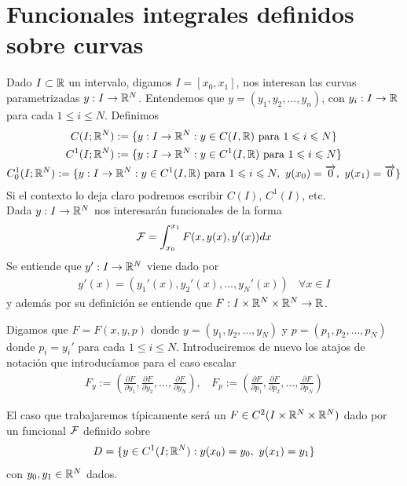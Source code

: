 \section{Funcionales integrales definidos sobre curvas}
Dado $I\subset \mathbb{R}$ un intervalo, digamos $I=[x_0, x_1]$, nos interesan las curvas parametrizadas $y:I \to \mathbb{R}^N$. Entendemos que $y=(y_1,y_2,...,y_n)$, con $y_i:I\to \mathbb{R}$ para cada $1\leq i \leq N$. Definimos 
\begin{gather*}
    C(I;\mathbb{R}^N):= \{y:I\to \mathbb{R}^N : y\in C(I,\mathbb{R})\text{ para } 1\leqslant i \leqslant N\}\\
    C^1(I;\mathbb{R}^N):= \{y:I\to \mathbb{R}^N : y\in C^1(I,\mathbb{R})\text{ para } 1\leqslant i \leqslant N\}\\
    C_0^1(I;\mathbb{R}^N):= \{y:I\to \mathbb{R}^N : y\in C^1(I,\mathbb{R})\text{ para } 1\leqslant i \leqslant N,\ y(x_0) = \overrightarrow{0},\ y(x_1) = \overrightarrow{0}\}
\end{gather*}
Si el contexto lo deja claro podremos escribir $C(I)$, $C^1(I)$, etc.\\

Dada $y:I \to \mathbb{R}^N$ nos interesarán funcionales de la forma
\begin{gather*}
    \mathcal{F} = \int_{x_0}^{x_1} F(x, y(x), y'(x)) dx
\end{gather*}
Se entiende que $y':I \to \mathbb{R}^N$ viene dado por 
\begin{gather*}
    y'(x) = (y_1'(x), y_2'(x), ..., y_N'(x)) \ \ \ \ \forall x \in I
\end{gather*}
y además por su definición se entiende que $F:I\times \mathbb{R}^N \times \mathbb{R}^N \to \mathbb{R}$.\\

\begin{notacion}
    Digamos que $F=F(x,y,p)$ donde $y=(y_1, y_2,...,y_N)$ y $p = (p_1,p_2,...,p_N)$ donde $p_i = y_i'$ para cada $1\leq i \leq N$. Introduciremos de nuevo los atajos de notación que introducíamos para el caso escalar
    \begin{gather*}
        F_y := \left(\frac{\partial F}{\partial y_1}, \frac{\partial F}{\partial y_2}, ..., \frac{\partial F}{\partial y_N}\right),\ \ \ \
        F_p := \left(\frac{\partial F}{\partial p_1}, \frac{\partial F}{\partial p_2}, ..., \frac{\partial F}{\partial p_N}\right)
    \end{gather*}
\end{notacion}

El caso que trabajaremos típicamente será un $F\in C^2(I\times \mathbb{R}^N \times \mathbb{R}^N)$ dado por un funcional $\mathcal{F}$ definido sobre
\begin{gather*}
    D = \{y\in C^1(I;\mathbb{R}^N) : y(x_0) = y_0,\ y(x_1)=y_1\}
\end{gather*}
con $y_0, y_1\in \mathbb{R}^N$ dados.\\


